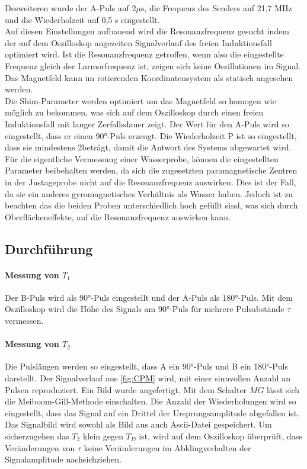 Desweiteren wurde der A-Puls auf 2$\mu$s, die Frequenz des Senders auf 21,7 MHz und die
Wiederholzeit auf 0,5 s eingestellt.\\
Auf diesen Einstellungen aufbauend wird die Resonanzfrequenz gesucht indem
der auf dem Oszilloskop angezeiten Signalverlauf des freien Induktionsfall optimiert
wird. Ist die Resonanzfrequenz getroffen, wenn also die eingestellte Frequenz gleich
der Larmorfrequenz ist, zeigen sich keine Oszillationen im Signal. Das Magnetfeld
kann im rotierenden Koordinatensystem als statisch angesehen werden.\\
Die Shim-Parameter werden optimiert um das Magnetfeld so homogen wie möglich zu bekommen,
was sich auf dem Oszilloskop durch einen freien Induktionsfall mit langer Zerfallsdauer
zeigt. Der Wert für den A-Puls wird so eingestellt, dass er einen 90°-Puls
erzeugt. Die Wiederholzeit P  ist so eingestellt, dass sie mindestens 2\tau beträgt,
damit die Antwort des Systems abgewartet wird.\\
Für die eigentliche Vermessung einer Wasserprobe, können die eingestellten Parameter
beibehalten werden, da sich die zugesetzten paramagnetische Zentren in der
Justageprobe nicht auf die Resonanzfrequenz auswirken. Dies ist der Fall,
da sie ein anderes gyromagnetisches Verhältnis als Wasser haben. Jedoch ist
zu beachten das die beiden Proben unterschiedlich hoch gefüllt sind, was sich durch
Oberflächeneffekte, auf die Resonanzfrequenz auswirken kann.
\subsection{Durchführung}
\paragraph{Messung von $T_1$} Der B-Puls wird als 90°-Puls eingestellt und
der A-Puls als 180°-Puls. Mit dem Oszilloskop wird die Höhe des Signals am
90°-Puls für mehrere Pulsabstände $\tau$ vermessen.
\paragraph{Messung von $T_2$}
Die Pulslängen werden so eingestellt, dass A ein 90°-Puls und B ein 180°-Puls
darstellt. Der Signalverlauf aus \ref{fig:CPM} wird, mit einer sinnvollen
Anzahl an Pulsen reproduziert. Ein Bild wurde angefertigt.
Mit dem Schalter $MG$ lässt sich die Meiboom-Gill-Methode einschalten. Die Anzahl
der Wiederholungen wird so eingestellt, dass das Signal auf ein Drittel
der Ursprungsamplitude abgefallen ist. Das Signalbild wird
sowohl als Bild aus auch Ascii-Datei gespeichert. Um sicherzugehen
das $T_2$ klein gegen $T_D$ ist, wird auf dem Oszilloskop überprüft, dass Veränderungen
von $\tau$ keine Veränderungen im Abklingverhalten der Signalamplitude nachsichziehen.
